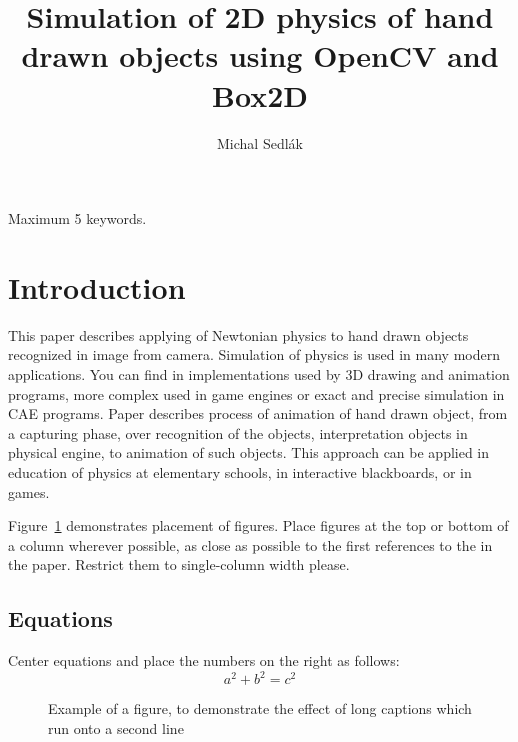\documentclass{ifacconf}
\begin{document}
\begin{frontmatter}
\title{Simulation of 2D physics of hand drawn objects using OpenCV and Box2D}
\author[Bratislava]{Michal Sedlák}
\address[Bratislava]{Faculty of Electrical Engineering and Information Technology, Slovak University of Technology,
Ilkovičova 3, 812 19 Bratislava, Slovakia
\\
(e-mail: michal.sedlak@stuba.sk)}
\begin{abstract}

\end{abstract}
\begin{keyword}
Maximum 5 keywords.
\end{keyword}
\end{frontmatter}

\section{Introduction}
This paper describes applying of Newtonian physics to hand drawn objects recognized in image from camera. Simulation of physics is used in many modern applications. You can find in implementations used by 3D drawing and animation programs, more complex used in game engines or exact and precise simulation in CAE programs. Paper describes process of animation of hand drawn object, from a capturing phase, over recognition of the objects, interpretation objects in physical engine, to animation of such objects. This approach can be applied in education of physics at elementary schools, in interactive blackboards, or in games.



Figure~\ref{fig:song} demonstrates placement of figures. Place figures at
the top or bottom of a column wherever possible, as close as possible
to the first references to the in the paper. Restrict them to
single-column width please.

\subsection{Equations}
Center equations and place the numbers on the right as follows:
\begin{equation}
a^2+b^2=c^2
\end{equation}

\begin{figure}
\vspace*{3cm}
\caption{Example of a figure, to demonstrate the effect of
  long captions which run onto a second line}
\label{fig:song}
\end{figure}
\end{document}
